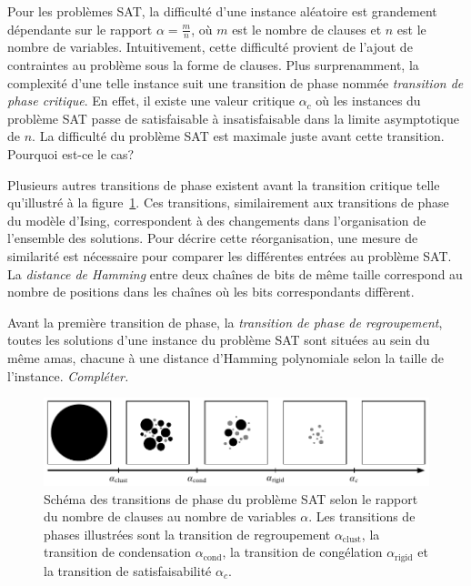 Pour les problèmes SAT, la difficulté d'une instance aléatoire est grandement dépendante sur le rapport $\alpha = \frac{m}{n}$, où $m$ est le nombre de clauses et $n$ est le nombre de variables. Intuitivement, cette difficulté provient de l'ajout de contraintes au problème sous la forme de clauses. Plus surprenamment, la complexité d'une telle instance suit une transition de phase nommée \textit{transition de phase critique}. En effet, il existe une valeur critique $\alpha_{c}$ où les instances du problème SAT passe de satisfaisable à insatisfaisable dans la limite asymptotique de $n$. La difficulté du problème SAT est maximale juste avant cette transition. Pourquoi est-ce le cas?

Plusieurs autres transitions de phase existent avant la transition critique telle qu'illustré à la figure~\ref{fig:transitions-de-phase}. Ces transitions, similairement aux transitions de phase du modèle d'Ising, correspondent à des changements dans l'organisation de l'ensemble des solutions. Pour décrire cette réorganisation, une mesure de similarité est nécessaire pour comparer les différentes entrées au problème SAT. La \textit{distance de Hamming} entre deux chaînes de bits de même taille correspond au nombre de positions dans les chaînes où les bits correspondants diffèrent. 


Avant la première transition de phase, la \textit{transition de phase de regroupement}, toutes les solutions d'une instance du problème SAT sont situées au sein du même amas, chacune à une distance d'Hamming polynomiale selon la taille de l'instance. \textcolor{mydarkred}{\textit{Compléter.}}


\begin{figure}[h]
    \centering
    \includegraphics[width=1\textwidth]{figures/phase-transitions.pdf}
    \caption[Transitions de phase du problème SAT]{Schéma des transitions de phase du problème SAT selon le rapport du nombre de clauses au nombre de variables $\alpha$. Les transitions de phases illustrées sont la transition de regroupement $\alpha_{\text{clust}}$, la transition de condensation $\alpha_{\text{cond}}$, la transition de congélation $\alpha_{\text{rigid}}$ et la transition de satisfaisabilité $\alpha_{c}$.}
    \label{fig:transitions-de-phase}
\end{figure}

